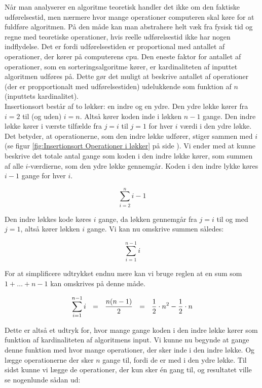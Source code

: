Når man analyserer en algoritme teoretisk handler det ikke om den faktiske udførelsestid, men nærmere hvor mange operationer computeren skal køre for at fuldføre algoritmen. På den måde kan man abstrahere helt væk fra fysisk tid og regne med teoretiske operationer, hvis reelle udførelsestid ikke har nogen indflydelse. Det er fordi udførelsestiden er proportional med antallet af operationer, der kører på computerens cpu. Den eneste faktor for antallet af operationer, som en sorteringsalgoritme kører, er kardinaliteten af inputtet algoritmen udføres på. Dette gør det muligt at beskrive antallet af operationer (der er propportionalt med udførelsestiden) udelukkende som funktion af $n$ (inputtets kardinalitet). \cite[s. 42]{aogd}\\


Insertionsort består af to løkker: en indre og en ydre. Den ydre løkke kører fra $i = 2$ til (og uden) $i = n$. Altså kører koden inde i løkken $n - 1$ gange. Den indre løkke kører i værste tilfælde fra $j = i$ til $j = 1$ for hver $i$ værdi i den ydre løkke. Det betyder, at operationerne, som den indre løkke udfører, stiger sammen med $i$ (se figur \ref{fig:Insertionsort Operationer i løkker} på side \pageref{fig:Insertionsort Operationer i løkker}). Vi ender med at kunne beskrive det totale antal gange som koden i den indre løkke kører, som summen af alle $i$-værdierne, som den ydre løkke gennemgår. Koden i den indre lykke køres $i-1$ gange for hver $i$.

$$\sum_{i=2}^{n}i-1$$

Den indre løkkes kode køres $i$ gange, da løkken gennemgår fra $j=i$ til og med $j=1$, altså kører løkken $i$ gange. Vi kan nu omskrive summen således:

$$\sum_{i=1}^{n-1}i$$

For at simplificere udtrykket endnu mere kan vi bruge reglen at en sum som $1 + \dots + n -1$ kan omskrives på denne måde. 

$$\sum_{i=1}^{n-1}i \:\:\:=\:\:\: \frac{n(n-1)}{2} \:\:\:=\:\:\: \frac{1}{2}\cdot  n^2 - \frac{1}{2}\cdot  n$$

Dette er altså et udtryk for, hvor mange gange koden i den indre løkke kører som funktion af kardinaliteten af algoritmens input. Vi kunne nu begynde at gange denne funktion med hvor mange operationer, der sker inde i den indre løkke. Og lægge operationerne der sker $n$ gange til, fordi de er med i den ydre løkke. Til sidst kunne vi lægge de operationer, der kun sker én gang til, og resultatet ville se nogenlunde sådan ud:

